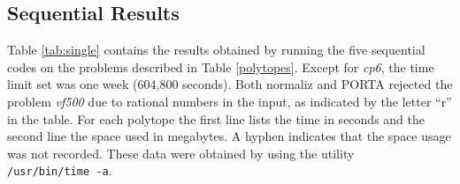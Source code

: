 \documentclass[a4paper,11pt]{article}   \usepackage{authblk} \usepackage[top=1.9cm,bottom=1.9cm,left=1.9cm,right=1.9cm]{geometry}
\newcommand{\progname}{\textsf}
\newcommand{\normaliz}{\progname{normaliz}\xspace}
\newcommand{\porta}{\progname{PORTA}\xspace}
\newcommand{\polytope}{\emph}
\newcommand{\cpsix}{\polytope{cp6}\xspace}
\newcommand{\vffive}{\polytope{vf500}\xspace}
\begin{document}
\subsection{Sequential Results}
\label{subsec:sequential}

Table \ref{tab:single} contains the results obtained by running the five sequential codes
on the problems described in Table \ref{polytopes}.
Except for \cpsix, the time limit set was one week (604,800 seconds).
Both \normaliz and \porta rejected the problem \vffive due to rational numbers
in the input, as indicated by the letter ``r'' in the table.
For each polytope the first line lists the time in seconds and the second line the space used in megabytes. A hyphen indicates that the space usage was not recorded.
These data were obtained by using the utility \texttt{/usr/bin/time~-a}.
\end{document}
